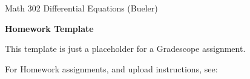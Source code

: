 \documentclass[12pt]{amsart}
\begin{document}
\scriptsize \noindent Math 302 Differential Equations (Bueler)
\normalsize\medskip

\Large\centerline{\textbf{Homework Template}}
\large
\bigskip \bigskip

\normalsize
This template is just a placeholder for a Gradescope assignment.

\bigskip
For Homework assignments, and upload instructions, see:

\begin{center}
\Large
{}
\end{center}
\end{document}
